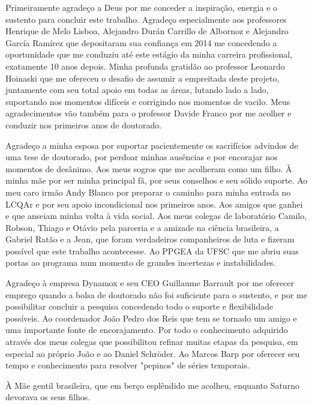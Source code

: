 \begin{agradecimentos}
	Primeiramente agradeço a Deus por me conceder a inspiração, energia e o sustento para concluir este trabalho. Agradeço especialmente aos professores Henrique de Melo Lisboa, Alejandro Durán Carrillo de Albornoz e Alejandro García Ramírez que depositaram sua confiança em 2014 me concedendo a oportunidade que me conduziu até este estágio da minha carreira profissional, exatamente 10 anos depois. Minha profunda gratidão ao professor Leonardo Hoinaski que me ofereceu o desafio de assumir a empreitada deste projeto, juntamente com seu total apoio em todas as áreas, lutando lado a lado, suportando nos momentos difíceis e corrigindo nos momentos de vacilo. Meus agradecimentos vão também para o professor Davide Franco por me acolher e conduzir nos primeiros anos de doutorado. 

	Agradeço a minha esposa por suportar pacientemente os sacrifícios advindos de uma tese de doutorado, por perdoar minhas ausências e por encorajar nos momentos de desânimo. Aos meus sogros que me acolheram como um filho. À minha mãe por ser minha principal fã, por seus conselhos e seu sólido suporte. Ao meu caro irmão Andy Blanco por preparar o caminho para minha entrada no LCQAr e por seu apoio incondicional nos primeiros anos. Aos amigos que ganhei e que anseiam minha volta à vida social. Aos meus colegas de laboratório Camilo, Robson, Thiago e Otávio pela parceria e a amizade na ciência brasileira, a Gabriel Ratão e a Jean, que foram verdadeiros companheiros de luta e fizeram possível que este trabalho acontecesse. Ao PPGEA da UFSC que me abriu suas portas ao programa num momento de grandes incertezas e instabilidades.

	Agradeço à empresa Dynamox e seu CEO Guillaume Barrault por me oferecer emprego quando a bolsa de doutorado não foi suficiente para o sustento, e por me possibilitar concluir a pesquisa concedendo todo o suporte e flexibilidade possíveis. Ao coordenador João Pedro dos Reis que tem se tornado um amigo e uma importante fonte de encorajamento. Por todo o conhecimento adquirido através dos meus colegas que possibilitou refinar muitas etapas da pesquisa, em especial ao próprio João e ao Daniel Schröder. Ao Marcos Barp por oferecer seu tempo e conhecimento para resolver "pepinos" de séries temporais.

	À Mãe gentil brasileira, que em berço esplêndido me acolheu, enquanto Saturno devorava os seus filhos.
\end{agradecimentos}

